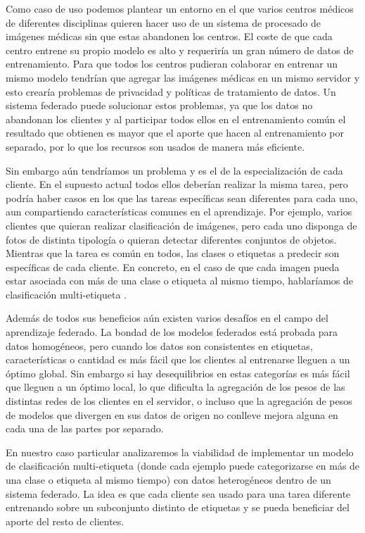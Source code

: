 Como caso de uso podemos plantear un entorno en el que varios centros médicos de diferentes disciplinas quieren hacer uso de un sistema de procesado de imágenes médicas sin que estas abandonen los centros. El coste de que cada centro entrene su propio modelo es alto y requeriría un gran número de datos de entrenamiento. Para que todos los centros pudieran colaborar en entrenar un mismo modelo tendrían que agregar las imágenes médicas en un mismo servidor y esto crearía problemas de privacidad y políticas de tratamiento de datos. Un sistema federado puede solucionar estos problemas, ya que los datos no abandonan los clientes y al participar todos ellos en el entrenamiento común el resultado que obtienen es mayor que el aporte que hacen al entrenamiento por separado, por lo que los recursos son usados de manera más eficiente.

Sin embargo aún tendríamos un problema y es el de la especialización de cada cliente. En el supuesto actual todos ellos deberían realizar la misma tarea, pero podría haber casos en los que las tareas específicas sean diferentes para cada uno, aun compartiendo características comunes en el aprendizaje. Por ejemplo, varios clientes que quieran realizar clasificación de imágenes, pero cada uno disponga de fotos de distinta tipología o quieran detectar diferentes conjuntos de objetos. Mientras que la tarea es común en todos, las clases o etiquetas a predecir son específicas de cada cliente. En concreto, en el caso de que cada imagen pueda estar asociada con más de una clase o etiqueta al mismo tiempo, hablaríamos de clasificación multi-etiqueta \cite{Moyano:MULTI}.

Además de todos sus beneficios aún existen varios desafíos en el campo del aprendizaje federado. La bondad de los modelos federados está probada para datos homogéneos, pero cuando los datos son consistentes en etiquetas, características o cantidad es más fácil que los clientes al entrenarse lleguen a un óptimo global. Sin embargo si hay desequilibrios en estas categorías es más fácil que lleguen a un óptimo local, lo que dificulta la agregación de los pesos de las distintas redes de los clientes en el servidor, o incluso que la agregación de pesos de modelos que divergen en sus datos de origen no conlleve mejora alguna en cada una de las partes por separado.

En nuestro caso particular analizaremos la viabilidad de implementar un modelo de clasificación multi-etiqueta (donde cada ejemplo puede categorizarse en más de una clase o etiqueta al mismo tiempo) con datos heterogéneos dentro de un sistema federado. La idea es que cada cliente sea usado para una tarea diferente entrenando sobre un subconjunto distinto de etiquetas y se pueda beneficiar del aporte del resto de clientes.

